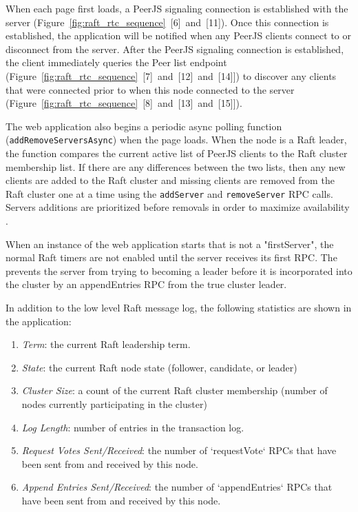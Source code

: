 \documentclass[9pt]{extarticle}
\begin{document}
\begin{multicols}{2}
When each page first loads, a PeerJS signaling connection is
established with the server
(Figure~\ref{fig:raft_rtc_sequence}~[6]~and~[11]). Once this
connection is established, the application will be notified when any
PeerJS clients connect to or disconnect from the server.  After the
PeerJS signaling connection is established, the client immediately
queries the Peer list endpoint
(Figure~\ref{fig:raft_rtc_sequence}~[7]~and~[12]~and~[14]]) to discover
any clients that were connected prior to when this node connected to
the server (Figure~\ref{fig:raft_rtc_sequence}~[8]~and~[13]~and~[15]]).

The web application also begins a periodic async polling function
(\texttt{addRemoveServersAsync}) when the page loads. When the node is a Raft
leader, the function compares the current active list of PeerJS clients to
the Raft cluster membership list. If there are any differences between
the two lists, then any new clients are added to the Raft cluster and
missing clients are removed from the Raft cluster one at a time using
the \texttt{addServer} and \texttt{removeServer} RPC calls. Servers
additions are prioritized before removals 
in order to maximize availability
\cite[Section~4.4]{raft_thesis:ongaro14}.

When an instance of the web application starts that is not
a "firstServer", the normal Raft timers are not enabled until the
server receives its first RPC. The prevents the server from
trying to becoming a leader before it is incorporated into the cluster
by an appendEntries RPC from the true cluster leader.

In addition to the low level Raft message log, the following
statistics are shown in the application:

\begin{enumerate}
\item \emph{Term}: the current Raft leadership term.
\item \emph{State}: the current Raft node state (follower, candidate,
    or leader)
\item \emph{Cluster Size}: a count of the current Raft cluster
    membership (number of nodes currently participating in the
    cluster)
\item \emph{Log Length}: number of entries in the transaction log.
\item \emph{Request Votes Sent/Received}: the number of `requestVote`
    RPCs that have been sent from and received by this node.
\item \emph{Append Entries Sent/Received}: the number of
    `appendEntries` RPCs that have been sent from and received by this
    node.
\end{enumerate}


\end{multicols}
\end{document}
